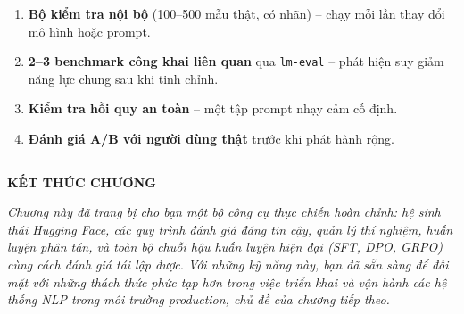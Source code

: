 \begin{tcolorbox}[title={Một quy trình đánh giá tối thiểu cho dự án thực tế}, colback=green!5!white, colframe=green!60!black, fonttitle=\bfseries]
\begin{enumerate}
	\item \textbf{Bộ kiểm tra nội bộ} (100--500 mẫu thật, có nhãn) -- chạy mỗi lần thay đổi mô hình hoặc prompt.
	\item \textbf{2--3 benchmark công khai liên quan} qua \texttt{lm-eval} -- phát hiện suy giảm năng lực chung sau khi tinh chỉnh.
	\item \textbf{Kiểm tra hồi quy an toàn} -- một tập prompt nhạy cảm cố định.
	\item \textbf{Đánh giá A/B với người dùng thật} trước khi phát hành rộng.
\end{enumerate}
\end{tcolorbox}

\bigskip
\hrule
\bigskip

\begin{center}
    \textbf{\Large KẾT THÚC CHƯƠNG \thechapter}
\end{center}

\textit{Chương này đã trang bị cho bạn một bộ công cụ thực chiến hoàn chỉnh: hệ sinh thái Hugging Face, các quy trình đánh giá đáng tin cậy, quản lý thí nghiệm, huấn luyện phân tán, và toàn bộ chuỗi hậu huấn luyện hiện đại (SFT, DPO, GRPO) cùng cách đánh giá tái lập được. Với những kỹ năng này, bạn đã sẵn sàng để đối mặt với những thách thức phức tạp hơn trong việc triển khai và vận hành các hệ thống NLP trong môi trường production, chủ đề của chương tiếp theo.}

